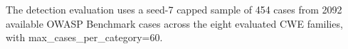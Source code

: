The detection evaluation uses a seed-7 capped sample of 454 cases from 2092 available OWASP Benchmark cases across the eight evaluated CWE families, with max_cases_per_category=60.
